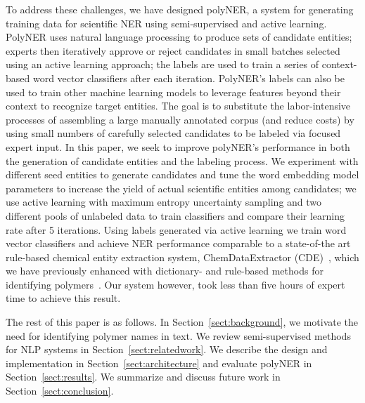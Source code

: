 To address these challenges, we have designed polyNER, a system for generating training data for scientific NER using semi-supervised and active learning. 
PolyNER uses natural language processing to produce sets of candidate entities;
experts then iteratively approve or reject candidates in small batches selected using an active learning approach;
the labels are used to train a series of context-based word vector classifiers after each iteration.
PolyNER's labels can also be used to train other machine learning models to leverage features beyond their context to recognize target entities.
The goal is
to substitute the labor-intensive processes of assembling a large
manually annotated corpus (and reduce costs) by using small numbers of carefully selected candidates to be labeled via focused expert input. 
In this paper, we seek to improve polyNER's performance in both the generation of candidate entities and the labeling process.
We experiment with different seed entities to generate candidates and tune the word embedding model parameters to increase the yield of actual scientific entities among candidates; we use active learning with maximum entropy uncertainty sampling and two different pools of unlabeled data to train classifiers and compare their learning rate after 5 iterations. 
Using labels generated via active learning we train word vector classifiers and achieve NER performance comparable to 
a state-of-the art rule-based chemical entity extraction
system, ChemDataExtractor (CDE)~\cite{swain2016chemdataextractor}, which we have previously enhanced
with dictionary- and rule-based methods for identifying polymers~\cite{tchoua2017towards}.
Our system however, took less than five hours of expert time to achieve this result.


The rest of this paper is as follows. 
In Section~\ref{sect:background}, we motivate the need for identifying polymer names in
text. 
We review semi-supervised methods for NLP systems in
Section~\ref{sect:relatedwork}. 
We describe the design and implementation in Section~\ref{sect:architecture} and evaluate polyNER
in Section~\ref{sect:results}. We summarize and discuss future work in Section~\ref{sect:conclusion}.